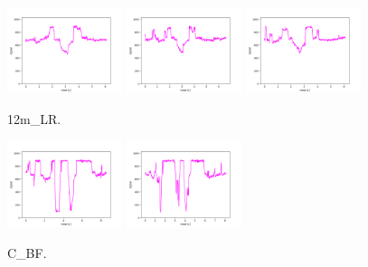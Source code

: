 \begin{figure}[!ht]
\begin{center}
\includegraphics[width=0.3\textwidth]{../data/12m_LR/12m_LR_1.png}
\includegraphics[width=0.3\textwidth]{../data/12m_LR/12m_LR_2.png}
\includegraphics[width=0.3\textwidth]{../data/12m_LR/12m_LR_3.png}
\caption{12m\_LR.\label{fig:12m_LR}}
\end{center}
\end{figure}

\begin{figure}[!ht]
\begin{center}
\includegraphics[width=0.3\textwidth]{../data/C_BF/C_BF_2.png}
\includegraphics[width=0.3\textwidth]{../data/C_BF/C_BF_3.png}
\caption{C\_BF.\label{fig:C_BF}}
\end{center}
\end{figure}

